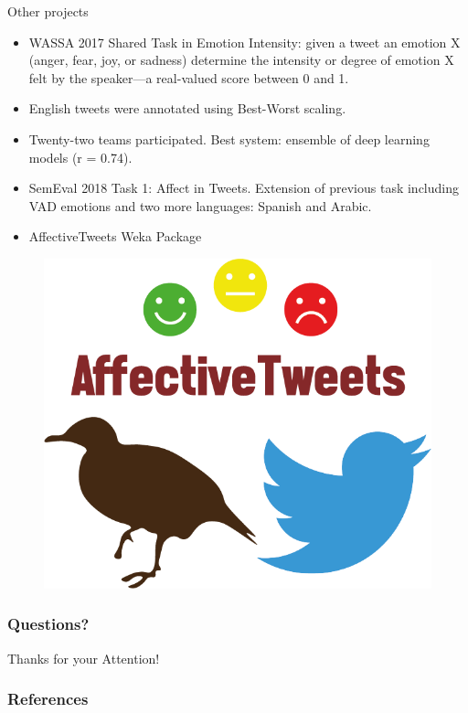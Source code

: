 \documentclass[handout]{beamer}
\begin{document}
\begin{frame}{Other projects}
\begin{scriptsize}
\begin{itemize}
\item  WASSA 2017 Shared Task in Emotion Intensity: given a tweet an emotion X (anger, fear, joy, or sadness) determine the intensity or degree of emotion X felt by the speaker—a real-valued score between 0 and 1. 
\item English tweets were annotated using Best-Worst scaling.
\item Twenty-two teams participated.  Best system: ensemble of deep learning models (r = 0.74).
\item SemEval 2018 Task 1: Affect in Tweets. Extension of previous task including VAD emotions and two more languages: Spanish and Arabic.
\item AffectiveTweets Weka Package
\end{itemize}
\end{scriptsize}

\begin{figure}[h!]
	\centering
	\includegraphics[scale=0.2]{pics/affectiveTweetsLogo.png}
\end{figure}

\end{frame}



\begin{frame}
\frametitle{Questions?}
\begin{center}\LARGE Thanks for your Attention!\\  \end{center}


\end{frame}

\begin{frame}[allowframebreaks]\scriptsize
\frametitle{References}


%
\end{frame}  


\end{document}
